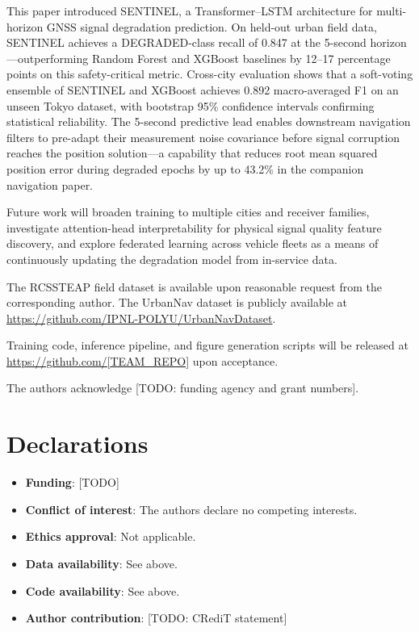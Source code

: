 \documentclass[pdflatex,sn-mathphys-num]{sn-jnl}
\begin{document}
This paper introduced SENTINEL, a Transformer--LSTM architecture for
multi-horizon GNSS signal degradation prediction.  On held-out urban field
data, SENTINEL achieves a DEGRADED-class recall of 0.847 at the 5-second
horizon---outperforming Random Forest and XGBoost baselines by 12--17
percentage points on this safety-critical metric.  Cross-city evaluation
shows that a soft-voting ensemble of SENTINEL and XGBoost achieves 0.892
macro-averaged F1 on an unseen Tokyo dataset, with bootstrap 95\% confidence
intervals confirming statistical reliability.  The 5-second predictive lead
enables downstream navigation filters to pre-adapt their measurement noise
covariance before signal corruption reaches the position solution---a
capability that reduces root mean squared position error during degraded
epochs by up to 43.2\% in the companion navigation paper.

Future work will broaden training to multiple cities and receiver
families, investigate attention-head interpretability for physical signal
quality feature discovery, and explore federated learning across vehicle
fleets as a means of continuously updating the degradation model from
in-service data.

\backmatter

The RCSSTEAP field dataset is available upon reasonable request from the
corresponding author.  The UrbanNav dataset is publicly available at
\url{https://github.com/IPNL-POLYU/UrbanNavDataset}.

Training code, inference pipeline, and figure generation scripts will be
released at \url{https://github.com/[TEAM_REPO]} upon acceptance.

The authors acknowledge [TODO: funding agency and grant numbers].

\section*{Declarations}
\begin{itemize}
\item \textbf{Funding}: [TODO]
\item \textbf{Conflict of interest}: The authors declare no competing interests.
\item \textbf{Ethics approval}: Not applicable.
\item \textbf{Data availability}: See above.
\item \textbf{Code availability}: See above.
\item \textbf{Author contribution}: [TODO: CRediT statement]
\end{itemize}


\end{document}
